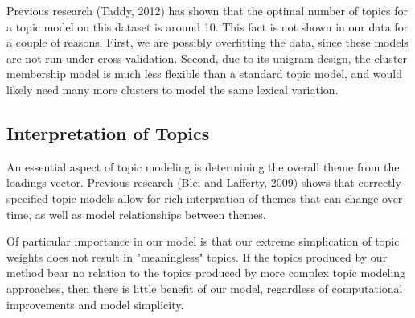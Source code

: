 \documentclass[12pt]{article}
\begin{document}
Previous research (Taddy, 2012) has shown that the optimal number of topics for a topic model on this dataset is around 10. This fact is not shown in our data for a couple of reasons. First, we are possibly overfitting the data, since these models are not run under cross-validation. Second, due to its unigram design, the cluster membership model is much less flexible than a standard topic model, and would likely need many more clusters to model the same lexical variation.




\subsection{Interpretation of Topics}

An essential aspect of topic modeling is determining the overall theme from the loadings vector. Previous research (Blei and Lafferty, 2009) shows that correctly-specified topic models allow for rich interpration of themes that can change over time, as well as model relationships between themes. 

Of particular importance in our model is that our extreme simplication of topic weights does not result in "meaningless" topics. 
If the topics produced by our method bear no relation to the topics produced by more complex topic modeling approaches, then there is little benefit of our model, regardless of computational improvements and model simplicity. 
\end{document}
